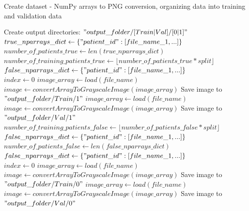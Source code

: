 \begin{algorithm}
    \caption{Create dataset - NumPy arrays to PNG conversion, organizing data into training and validation data}
    \label{alg:create_dataset}
    \begin{algorithmic}[1] %
        		\State Create output directories: $"output\_folder/[Train|Val]/[0|1]"$\\
        		\State $true\_nparrays\_dict \gets \{"patient\_id" : [file\_name\_1, ...]\}$
        		\State $number\_of\_patients\_true \gets len(true\_nparrays\_dict)$
        		\State $number\_of\_training\_patients\_true \gets \lfloor number\_of\_patients\_true * split \rfloor$
        		\State $false\_nparrays\_dict \gets \{"patient\_id" : [file\_name\_1, ...]\}$\\
        		\State $index \gets 0$
        			 
        					\State $image\_array \gets load(file\_name)$
        					\State $image \gets convertArrayToGrayscaleImage(image\_array)$
        					\State Save image to $"output\_folder/Train/1"$
        				\EndFor
        			\Else {}
        					\State $image\_array \gets load(file\_name)$
        					\State $image \gets convertArrayToGrayscaleImage(image\_array)$
        					\State Save image to $"output\_folder/Val/1"$
        				\EndFor
        			\EndIf
        		\EndFor\\
        		\State $number\_of\_training\_patients\_false \gets \lfloor number\_of\_patients\_false * split \rfloor$
        		\State $false\_nparrays\_dict \gets \{"patient\_id" : [file\_name\_1, ...]\}$
        		\State $number\_of\_patients\_false \gets len(false\_nparrays\_dict)$
        		\State $false\_nparrays\_dict \gets \{"patient\_id" : [file\_name\_1, ...]\}$\\
        		\State $index \gets 0$
        			 
        					\State $image\_array \gets load(file\_name)$
        					\State $image \gets convertArrayToGrayscaleImage(image\_array)$
        					\State Save image to $"output\_folder/Train/0"$
        				\EndFor
        			\Else {}
        					\State $image\_array \gets load(file\_name)$
        					\State $image \gets convertArrayToGrayscaleImage(image\_array)$
        					\State Save image to $"output\_folder/Val/0"$
        				\EndFor
        			\EndIf
        		\EndFor
        \EndProcedure
    \end{algorithmic}
\end{algorithm}

